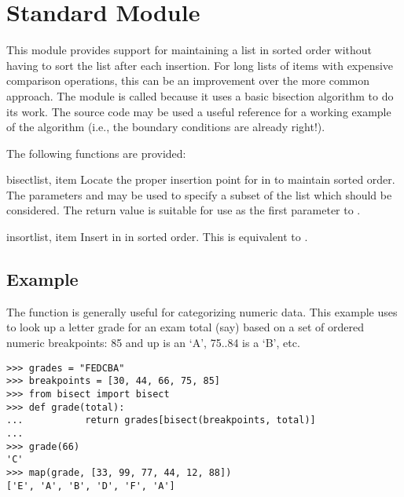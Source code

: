 
\section{Standard Module }




This module provides support for maintaining a list in sorted order
without having to sort the list after each insertion.  For long lists
of items with expensive comparison operations, this can be an
improvement over the more common approach.  The module is called
 because it uses a basic bisection algorithm to do its
work.  The source code may be used a useful reference for a working
example of the algorithm (i.e., the boundary conditions are already
right!).

The following functions are provided:

\begin{funcdesc}{bisect}{list, item}
Locate the proper insertion point for  in  to
maintain sorted order.  The parameters  and  may be
used to specify a subset of the list which should be considered.  The
return value is suitable for use as the first parameter to
.
\end{funcdesc}

\begin{funcdesc}{insort}{list, item}
Insert  in  in sorted order.  This is equivalent
to .
\end{funcdesc}


\subsection{Example}

The  function is generally useful for categorizing
numeric data.  This example uses  to look up a
letter grade for an exam total (say) based on a set of ordered numeric
breakpoints: 85 and up is an `A', 75..84 is a `B', etc.

\begin{verbatim}
>>> grades = "FEDCBA"
>>> breakpoints = [30, 44, 66, 75, 85]
>>> from bisect import bisect
>>> def grade(total):
...           return grades[bisect(breakpoints, total)]
...
>>> grade(66)
'C'
>>> map(grade, [33, 99, 77, 44, 12, 88])
['E', 'A', 'B', 'D', 'F', 'A']
\end{verbatim}
